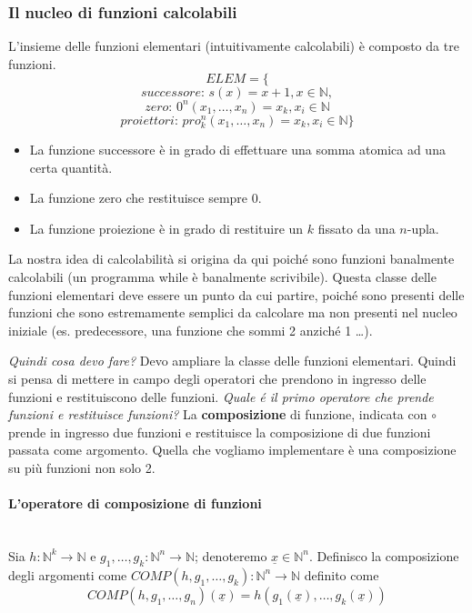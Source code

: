 \documentclass{article}
\begin{document}
\subsubsection{Il nucleo di funzioni calcolabili}
L'insieme delle funzioni elementari (intuitivamente calcolabili) è composto da tre funzioni.
$$ELEM=\{$$
$$\textit{successore: }s(x)=x+1, x\in\mathbb{N},$$
$$\textit{zero: }0^n(x_1,\dots,x_n)=x_k, x_i\in\mathbb{N}$$
$$\textit{proiettori: }pro_k^n(x_1,\dots,x_n)=x_k,x_i\in\mathbb{N}\}$$


\begin{itemize}
    \item La funzione successore è in grado di effettuare una somma atomica ad una certa quantità.
    \item La funzione zero che restituisce sempre 0.
    \item La funzione proiezione è in grado di restituire un $k$ fissato da una $n$-upla.
\end{itemize}
La nostra idea di calcolabilità si origina da qui poiché sono funzioni
banalmente calcolabili (un programma while è banalmente scrivibile). Questa classe delle funzioni
elementari deve essere un punto da cui partire, poiché sono presenti delle funzioni che
sono estremamente semplici da calcolare ma non presenti nel nucleo iniziale (es. predecessore, una funzione
che sommi 2 anziché 1 \dots).

\textit{Quindi cosa devo fare?} Devo ampliare la classe delle funzioni elementari. Quindi
si pensa di mettere in campo degli operatori che prendono in ingresso delle funzioni e restituiscono
delle funzioni. \textit{Quale é il primo operatore che prende funzioni e restituisce funzioni?}
La \textbf{composizione} di funzione, indicata con $\circ$ prende in ingresso due funzioni e restituisce
la composizione di due funzioni passata come argomento. Quella che vogliamo implementare è una
composizione su più funzioni non solo 2.

\paragraph{L'operatore di composizione di funzioni}\mbox{}\\
Sia $h:\mathbb{N}^k\rightarrow\mathbb{N}$ e $g_1,\dots,g_k:\mathbb{N}^n\rightarrow\mathbb{N}$;
denoteremo $\underline{x}\in\mathbb{N}^n$.
Definisco la composizione degli argomenti come $COMP(h,g_1,\dots,g_k):\mathbb{N}^n\rightarrow\mathbb{N}$
definito come
$$COMP(h,g_1,\dots,g_n)(\underline{x})=h(g_1(\underline{x}),\dots,g_k(\underline{x}))$$
\end{document}
